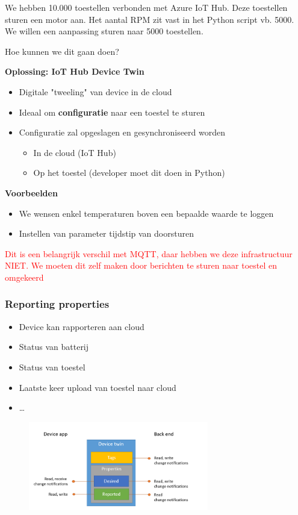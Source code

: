 \documentclass{article}
\newcommand{\bold}[1]{\textbf{#1}}
\begin{document}
We hebben 10.000 toestellen verbonden met Azure IoT Hub. Deze toestellen sturen een
motor aan. Het aantal RPM zit vast in het Python script vb. 5000.
We willen een aanpassing sturen naar 5000 toestellen.

Hoe kunnen we dit gaan doen?

\bold{Oplossing: IoT Hub Device Twin}

\begin{itemize}
    \item Digitale "tweeling" van device in de cloud
    \item Ideaal om \bold{configuratie} naar een toestel te sturen
    \item Configuratie zal opgeslagen en gesynchroniseerd worden
    \begin{itemize}
        \item In de cloud (IoT Hub)
        \item Op het toestel (developer moet dit doen in Python)
    \end{itemize}
\end{itemize}

\bold{Voorbeelden}

\begin{itemize}
    \item We wensen enkel temperaturen boven een bepaalde waarde te loggen
    \item Instellen van parameter tijdstip van doorsturen
\end{itemize}

\textcolor{red}{Dit is een belangrijk verschil met MQTT, daar hebben we deze infrastructuur NIET. We
moeten dit zelf maken door berichten te sturen naar toestel en omgekeerd}

\subsubsection{Reporting properties}

\begin{itemize}
    \item Device kan rapporteren aan cloud
    \item Status van batterij
    \item Status van toestel
    \item Laatste keer upload van toestel naar cloud
    \item \dots
\end{itemize}

\begin{figure}[H]
    \centering
    \includegraphics[width=0.7\textwidth]{iot-device-twin.png}
    \caption{}
\end{figure}
\end{document}
